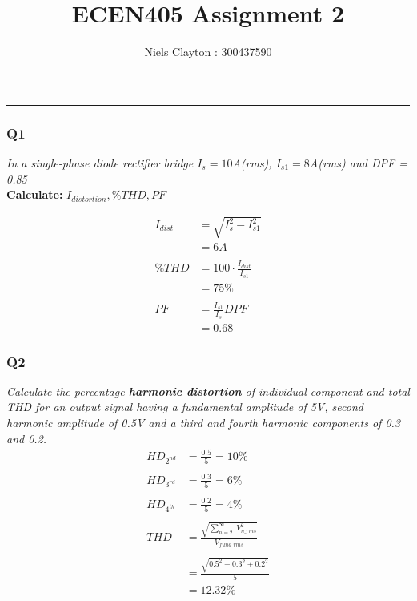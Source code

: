 \documentclass[a4paper,11pt]{article}
\begin{document}
\title{\LARGE{\textbf{ECEN405 Assignment 2}}}
\author{Niels Clayton : 300437590}
\date{}
\maketitle
\hrule

\subsubsection*{Q1}

\textit{In a single-phase diode rectifier bridge $I_s = 10$A(rms), $I_{s1}=8$A(rms) and DPF = 0.85}\\
\textbf{Calculate:} $I_{distortion}, \%THD, PF$

\begin{align*}
    I_{dist} & = \sqrt{I_{s}^{2}-I_{s1}^{2}}     \\
             & = 6A                              \\\\
    \%THD    & = 100\cdot\frac{I_{dist}}{I_{s1}} \\
             & = 75\%                            \\\\
    PF       & = \frac{I_{s1}}{I_{s}}DPF         \\
             & = 0.68
\end{align*}


\subsubsection*{Q2}
\textit{Calculate the percentage \textbf{harmonic distortion} of individual component and total THD for an output signal having a fundamental amplitude of 5V, second harmonic amplitude of 0.5V and a third and fourth harmonic components of 0.3 and 0.2.}\\

\begin{align*}
    HD_{2^{nd}} & = \frac{0.5}{5} = 10\%                                                \\\\
    HD_{3^{rd}} & = \frac{0.3}{5} = 6\%                                                 \\\\
    HD_{4^{th}} & = \frac{0.2}{5} = 4\%                                                 \\\\
    THD         & = \frac{\sqrt{ \sum_{n=2}^{\infty} \; V^2_{n\_rms} }}{ V_{fund\_rms}} \\\\
                & = \frac{\sqrt{ 0.5^2 + 0.3^2 + 0.2^2 }}{ 5 }                          \\
                & = 12.32\%
\end{align*}
\end{document}
